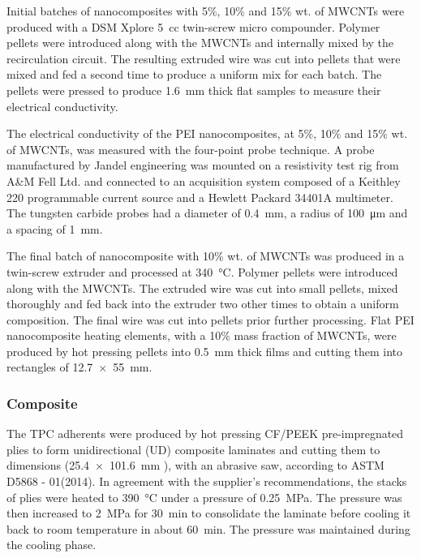 \documentclass[11pt,review,times]{elsarticle}
\begin{document}
Initial batches of nanocomposites with 5\%, 10\% and 15\% wt. of MWCNTs were produced with a DSM Xplore 5~cc twin-screw micro compounder. 
Polymer pellets were introduced along with the MWCNTs and internally mixed by the recirculation circuit.
The resulting extruded wire was cut into pellets that were mixed and fed a second time to produce a uniform mix for each batch. 
The pellets were pressed to produce \SI{1.6}{\mm} thick flat samples to measure their electrical conductivity.  

The electrical conductivity of the PEI nanocomposites, at 5\%, 10\% and 15\% wt. of MWCNTs, was measured with the four-point probe technique. 
A probe manufactured by Jandel engineering was mounted on a resistivity test rig from A\&M Fell Ltd. and connected to an acquisition system composed of a Keithley 220 programmable current source and a Hewlett Packard 34401A multimeter. 
The tungsten carbide probes had a diameter of \SI{0.4}{\mm}, a radius of \SI{100}{\um} and a spacing of \SI{1}{\mm}. 

The final batch of nanocomposite with 10\% wt. of MWCNTs was produced in a twin-screw extruder and processed at \SI{340}{\celsius}. 
Polymer pellets were introduced along with the MWCNTs. 
The extruded wire was cut into small pellets, mixed thoroughly and fed back into the extruder two other times to obtain a uniform composition. 
The final wire was cut into pellets prior further processing. 
Flat PEI nanocomposite heating elements, with a 10\% mass fraction of MWCNTs, were produced by hot pressing pellets into \SI{0.5}{\milli\metre} thick films and cutting them into rectangles of \SI{12.7 x 55}{\milli\metre}. 

\subsubsection{Composite}

The TPC adherents were produced by hot pressing CF/PEEK pre-impregnated plies to form unidirectional (UD) composite laminates and cutting them to dimensions (\SI{25.4 x 101.6}{\milli\metre} ), with an abrasive saw, according to ASTM D5868 - 01(2014). 
In agreement with the supplier’s recommendations, the stacks of plies were heated to \SI{390}{\celsius} under a pressure of \SI{0.25}{\MPa}. 
The pressure was then increased to \SI{2}{\MPa} for \SI{30}{\minute} to consolidate the laminate before cooling it back to room temperature in about \SI{60}{\minute}. 
The pressure was maintained during the cooling phase. 
\end{document}
